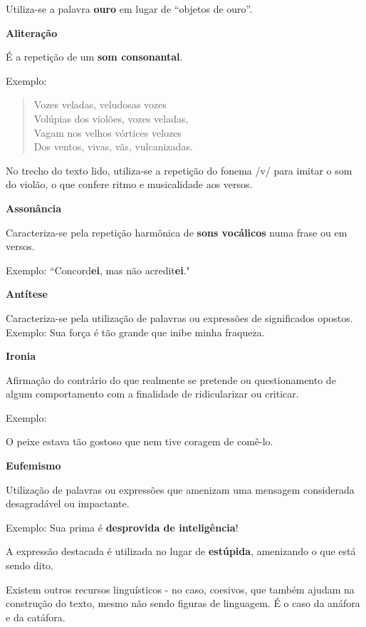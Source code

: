 {Utiliza-se a palavra \textbf{ouro} em lugar de ``objetos de ouro''.

\textbf{Aliteração}

É a repetição de um \textbf{som consonantal}.

Exemplo:

\begin{verse}
Vozes veladas, veludosas vozes\\
Volúpias dos violões, vozes veladas,\\
Vagam nos velhos vórtices velozes\\
Dos ventos, vivas, vãs, vulcanizadas.
\end{verse}


No trecho do texto lido, utiliza-se a repetição do fonema /v/ para
imitar o som do violão, o que confere ritmo e musicalidade aos versos.

\textbf{Assonância}

Caracteriza-se pela repetição harmônica de \textbf{sons vocálicos} numa
frase ou em versos.

Exemplo: ``Concord\textbf{ei}, mas não acredit\textbf{ei}."

\textbf{Antítese}

Caracteriza-se pela utilização de palavras ou expressões de significados
opostos. Exemplo: Sua força é tão grande que inibe minha fraqueza.

\textbf{Ironia}

Afirmação do contrário do que realmente se pretende ou questionamento de
algum comportamento com a finalidade de ridicularizar ou criticar.

Exemplo:

O peixe estava tão gostoso que nem tive coragem de comê-lo.

\textbf{Eufemismo}

Utilização de palavras ou expressões que amenizam uma mensagem
considerada desagradável ou impactante.

Exemplo: Sua prima é \textbf{desprovida de inteligência}!

A expressão destacada é utilizada no lugar de \textbf{estúpida},
amenizando o que está sendo dito.

Existem outros recursos linguísticos - no caso, coesivos, que também
ajudam na construção do texto, mesmo não sendo figuras de linguagem. É o
caso da anáfora e da catáfora.

}
